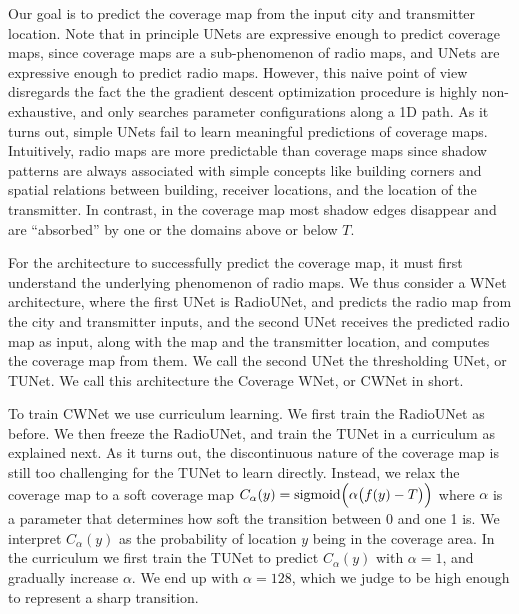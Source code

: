 \documentclass[10pt,a4paper]{article}
\begin{document}
Our goal is to predict the coverage map from the input city and transmitter location.
%
Note that in principle UNets are expressive enough to predict coverage maps, since coverage maps are a sub-phenomenon of radio maps, and UNets are expressive enough to predict radio maps. However, this naive point of view disregards 
the fact the the gradient descent optimization procedure is highly non-exhaustive, and only searches parameter configurations along a 1D path.
%
As it turns out, simple UNets fail to learn meaningful predictions of coverage maps.
Intuitively, %
 radio maps are more predictable than coverage maps since shadow patterns are always associated with simple concepts like building corners and spatial relations between building, receiver locations, and the location of the transmitter. 
In contrast, in the coverage map most shadow edges disappear and are ``absorbed'' by one or the domains 
above or below $T$.

For the architecture to successfully predict the coverage map, it must first understand the underlying phenomenon of radio maps. We thus consider a WNet architecture, where the first UNet  is RadioUNet, and predicts the radio map from the city and transmitter inputs, and the second UNet receives the predicted radio map as input, along with the map and the transmitter location, and computes the coverage map from them. We call the second UNet the thresholding UNet, or TUNet. We call this architecture the Coverage WNet, or CWNet in short.

To train CWNet we use curriculum learning. We first train the RadioUNet as before. We then freeze the RadioUNet, and train the TUNet in a curriculum as explained next. 
%
As it turns out, the discontinuous nature of the coverage map is still too challenging for the TUNet to learn directly. Instead, we relax the coverage map to a soft coverage map
$C_\alpha(y) = {\rm sigmoid}\Big(\alpha\big(f(y) - T\big)\Big)$
where $\alpha$ is a parameter that determines how soft the transition between 0 and one 1 is. 
We interpret $C_\alpha(y)$ as the probability of location $y$ being in the coverage area.
In the curriculum we first train the TUNet to predict $C_\alpha(y)$ with $\alpha=1$, and gradually increase 
$\alpha$. We end up with $\alpha=128$, which we judge to be high enough to represent a sharp transition.
\end{document}
